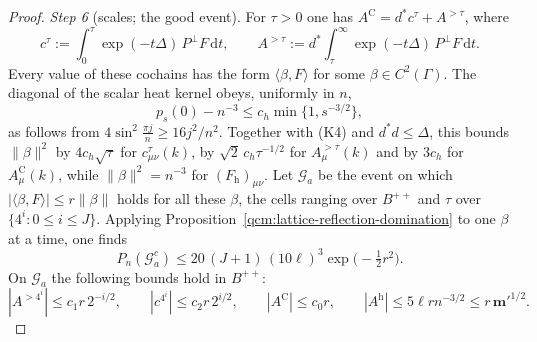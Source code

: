 \documentclass[11pt,letterpaper,reqno]{amsart}
\theoremstyle{definition}
\begin{document}
\begin{proof}
\emph{Step 6} (scales; the good event).
For $\tau>0$ one has $A^{\mathrm C}=d^*c^\tau+A^{>\tau}$, where
\begin{equation*}
c^\tau:=\int_0^\tau\exp(-t\Delta)\,P^\perp F\,\mathrm dt,\qquad A^{>\tau}:=d^*\int_\tau^\infty\exp(-t\Delta)\,P^\perp F\,\mathrm dt.
\end{equation*}
Every value of these cochains has the form $\langle\beta,F\rangle$ for some $\beta\in C^2(\Gamma)$.
The diagonal of the scalar heat kernel obeys, uniformly in $n$,
\begin{equation*}
p_s(0)-n^{-3}\le c_h\min\{1,s^{-3/2}\},
\end{equation*}
as follows from $4\sin^2\frac{\pi j}{n}\ge16j^2/n^2$.
Together with (K4) and $d^*d\le\Delta$, this bounds $\|\beta\|^2$ by $4c_h\sqrt\tau$ for $c^\tau_{\mu\nu}(k)$, by $\sqrt2\,c_h\tau^{-1/2}$ for $A^{>\tau}_\mu(k)$ and by $3c_h$ for $A^{\mathrm C}_\mu(k)$, while $\|\beta\|^2=n^{-3}$ for $(F_{\mathrm h})_{\mu\nu}$.
Let $\mathcal G_a$ be the event on which $|\langle\beta,F\rangle|\le r\|\beta\|$ holds for all these $\beta$, the cells ranging over $B^{++}$ and $\tau$ over $\{4^i:0\le i\le J\}$.
Applying Proposition~\ref{qcm:lattice-reflection-domination} to one $\beta$ at a time, one finds
\begin{equation*}
P_n(\mathcal G_a^c)\le20\,(J+1)\,(10\ell)^3\exp\bigl(-\tfrac12r^2\bigr).
\end{equation*}
On $\mathcal G_a$ the following bounds hold in $B^{++}$:
\begin{equation*}
|A^{>4^i}|\le c_1r\,2^{-i/2},\qquad|c^{4^i}|\le c_2r\,2^{i/2},\qquad|A^{\mathrm C}|\le c_0r,\qquad|A^{\mathrm h}|\le5\ell rn^{-3/2}\le r\,\mathbf m'^{1/2}.
\end{equation*}


\end{proof}
\end{document}
